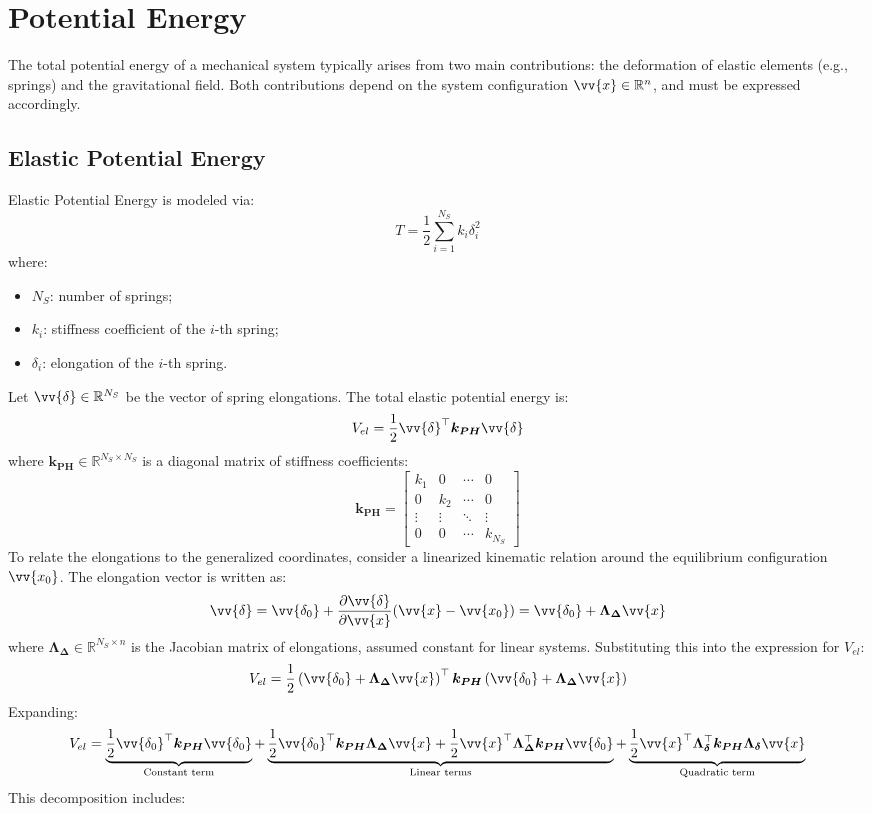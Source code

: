 \section{Potential Energy}

The total potential energy of a mechanical system typically arises from two main contributions: the deformation of elastic elements (e.g., springs) and the gravitational field. Both contributions depend on the system configuration \( \vv{x} \in \mathbb{R}^n \), and must be expressed accordingly.

\subsection{Elastic Potential Energy}

Elastic Potential Energy is modeled via:
\[
T = \frac{1}{2} \sum_{i=1}^{N_S} k_i \delta_i^2
\]
where:

\begin{itemize}
  \item \( N_S \): number of springs;
  \item \( k_i \): stiffness coefficient of the \( i \)-th spring;
  \item \( \delta_i \): elongation of the \( i \)-th spring.
\end{itemize}

Let \( \vv{\delta} \in \mathbb{R}^{N_S} \) be the vector of spring elongations. The total elastic potential energy is:
\[
V_{el} = \frac{1}{2} \vv{\delta}^\top \boldsymbol{k_{PH}} \vv{\delta}
\]
where \( \boldsymbol{k_{PH}} \in \mathbb{R}^{N_S \times N_S} \) is a diagonal matrix of stiffness coefficients:
\[
\boldsymbol{k_{PH}} =
\begin{bmatrix}
k_1 & 0 & \cdots & 0 \\
0 & k_2 & \cdots & 0 \\
\vdots & \vdots & \ddots & \vdots \\
0 & 0 & \cdots & k_{N_S}
\end{bmatrix}
\]
To relate the elongations to the generalized coordinates, consider a linearized kinematic relation around the equilibrium configuration \( \vv{x_0} \). The elongation vector is written as:
\[
\vv{\delta} = \vv{\delta_0} + \frac{\partial \vv{\delta}}{\partial \vv{x}} (\vv{x} - \vv{x_0}) = \vv{\delta_0} + \boldsymbol{\Lambda_{\Delta}} \vv{x}
\]
where \( \boldsymbol{\Lambda_{\Delta}} \in \mathbb{R}^{N_S \times n} \) is the Jacobian matrix of elongations, assumed constant for linear systems. Substituting this into the expression for \( V_{el} \):
\[
V_{el} = \frac{1}{2} \left( \vv{\delta_0} + \boldsymbol{\Lambda_{\Delta}} \vv{x} \right)^\top \boldsymbol{k_{PH}} \left( \vv{\delta_0} + \boldsymbol{\Lambda_{\Delta}} \vv{x} \right)
\]
Expanding:
\[
V_{el} = \underbrace{\frac{1}{2} \vv{\delta_0}^\top \boldsymbol{k_{PH}} \vv{\delta_0}}_{\text{Constant term}}
+ \underbrace{\frac{1}{2} \vv{\delta_0}^\top \boldsymbol{k_{PH}} \boldsymbol{\Lambda_{\Delta}} \vv{x}
+ \frac{1}{2} \vv{x}^\top \boldsymbol{\Lambda_{\Delta}}^\top \boldsymbol{k_{PH}} \vv{\delta_0}}_{\text{Linear terms}}
+ \underbrace{\frac{1}{2} \vv{x}^\top \boldsymbol{\Lambda_{\delta}}^\top \boldsymbol{k_{PH}} \boldsymbol{\Lambda_{\delta}} \vv{x}}_{\text{Quadratic term}}
\]
This decomposition includes:

